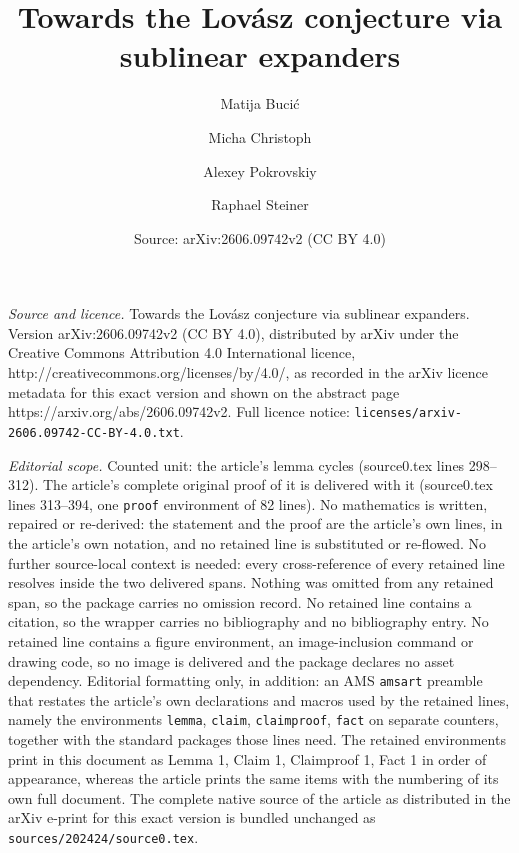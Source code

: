 \documentclass[10pt,a4paper]{amsart}
\title{Towards the Lov\'{a}sz conjecture via sublinear expanders}
\author{Matija Buci{\'c} \and Micha Christoph \and Alexey Pokrovskiy \and Raphael Steiner}
\date{Source: arXiv:2606.09742v2 (CC BY 4.0)}
\begin{document}
\maketitle

\noindent\emph{Source and licence.} Towards the Lov\'{a}sz conjecture via sublinear expanders. Version arXiv:2606.09742v2 (CC BY 4.0), distributed by arXiv under the Creative Commons Attribution 4.0 International licence, http://creativecommons.org/licenses/by/4.0/, as recorded in the arXiv licence metadata for this exact version and shown on the abstract page https://arxiv.org/abs/2606.09742v2. Full licence notice: \texttt{licenses/arxiv-2606.09742-CC-BY-4.0.txt}.\par\smallskip

\noindent\textit{Editorial scope.} Counted unit: the article's lemma cycles (source0.tex lines 298--312). The article's complete original proof of it is delivered with it (source0.tex lines 313--394, one \texttt{proof} environment of 82 lines). No mathematics is written, repaired or re-derived: the statement and the proof are the article's own lines, in the article's own notation, and no retained line is substituted or re-flowed.  No further source-local context is needed: every cross-reference of every retained line resolves inside the two delivered spans.  Nothing was omitted from any retained span, so the package carries no omission record.  No retained line contains a citation, so the wrapper carries no bibliography and no bibliography entry.  No retained line contains a figure environment, an image-inclusion command or drawing code, so no image is delivered and the package declares no asset dependency.  Editorial formatting only, in addition: an AMS \texttt{amsart} preamble that restates the article's own declarations and macros used by the retained lines, namely the environments \texttt{lemma}, \texttt{claim}, \texttt{claimproof}, \texttt{fact} on separate counters, together with the standard packages those lines need.  The retained environments print in this document as Lemma 1, Claim 1, Claimproof 1, Fact 1 in order of appearance, whereas the article prints the same items with the numbering of its own full document.  The complete native source of the article as distributed in the arXiv e-print for this exact version is bundled unchanged as \texttt{sources/202424/source0.tex}.
\end{document}
